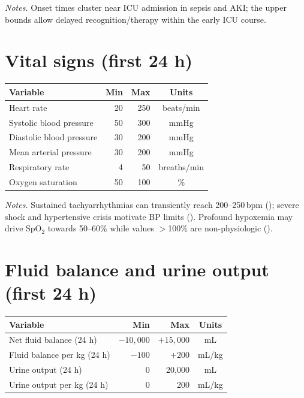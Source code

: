 \noindent\textit{Notes.} Onset times cluster near ICU admission in sepsis and AKI; the upper bounds allow delayed recognition/therapy within the early ICU course.

\vspace{0.75\baselineskip}
\section*{Vital signs (first 24 h)}
\vspace{0.75\baselineskip}
\begin{table}[ht!]\centering\small
\begin{tabular}{lrrc}
\toprule
\textbf{Variable} & \textbf{Min} & \textbf{Max} & \textbf{Units} \\
\midrule
Heart rate & 20 & 250 & beats/min \\
Systolic blood pressure & 50 & 300 & mmHg \\
Diastolic blood pressure & 30 & 200 & mmHg \\
Mean arterial pressure & 30 & 200 & mmHg \\
Respiratory rate & 4 & 50 & breaths/min \\
Oxygen saturation & 50 & 100 & \% \\
\bottomrule
\end{tabular}
\end{table}

\noindent\textit{Notes.} Sustained tachyarrhythmias can transiently reach 200–250\,bpm (\citealt{ClevelandPSVT}); severe shock and hypertensive crisis motivate BP limits (\citealt{GSTTStages,AnesthesiaHypotension}). Profound hypoxemia may drive SpO$_2$ towards 50–60\% while values $>$100\% are non-physiologic (\citealt{MayoHypoxemia,FPNotebookO2Sat}).

\vspace{0.75\baselineskip}
\section*{Fluid balance and urine output (first 24 h)}
\vspace{0.75\baselineskip}
\begin{table}[ht!]\centering\small
\begin{tabular}{lrrc}
\toprule
\textbf{Variable} & \textbf{Min} & \textbf{Max} & \textbf{Units} \\
\midrule
Net fluid balance (24 h) & $-10{,}000$ & $+15{,}000$ & mL \\
Fluid balance per kg (24 h) & $-100$ & $+200$ & mL/kg \\
Urine output (24 h) & 0 & 20{,}000 & mL \\
Urine output per kg (24 h) & 0 & 200 & mL/kg \\
\bottomrule
\end{tabular}
\end{table}

